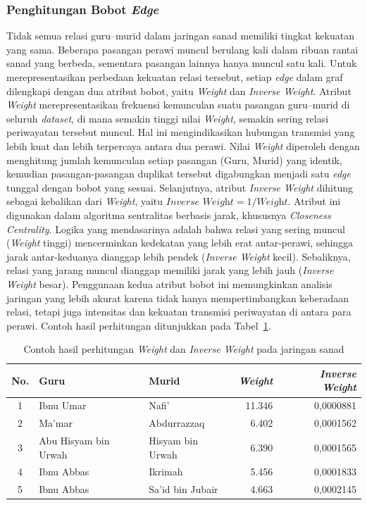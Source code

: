 \subsubsection{Penghitungan Bobot \textit{Edge}}
\label{subsubsec:bobot-edge}
Tidak semua relasi guru--murid dalam jaringan sanad memiliki tingkat kekuatan yang sama. Beberapa pasangan perawi muncul berulang kali dalam ribuan rantai sanad yang berbeda, sementara pasangan lainnya hanya muncul satu kali. 
Untuk merepresentasikan perbedaan kekuatan relasi tersebut, setiap \textit{edge} dalam graf dilengkapi dengan dua atribut bobot, yaitu \textit{Weight} dan \textit{Inverse Weight}.
Atribut \textit{Weight} merepresentasikan frekuensi kemunculan suatu pasangan guru--murid di seluruh \textit{dataset}, di mana semakin tinggi nilai \textit{Weight}, semakin sering relasi periwayatan tersebut muncul.
Hal ini mengindikasikan hubungan transmisi yang lebih kuat dan lebih terpercaya antara dua perawi. Nilai \textit{Weight} diperoleh dengan menghitung jumlah kemunculan setiap pasangan (Guru, Murid) yang identik, kemudian pasangan-pasangan duplikat tersebut digabungkan menjadi satu \textit{edge} tunggal dengan bobot yang sesuai.
Selanjutnya, atribut \textit{Inverse Weight} dihitung sebagai kebalikan dari \textit{Weight}, yaitu $\textit{Inverse Weight} = 1/\textit{Weight}$.
Atribut ini digunakan dalam algoritma sentralitas berbasis jarak, khususnya \textit{Closeness Centrality}.
Logika yang mendasarinya adalah bahwa relasi yang sering muncul (\textit{Weight} tinggi) mencerminkan kedekatan yang lebih erat antar-perawi, sehingga jarak antar-keduanya dianggap lebih pendek (\textit{Inverse Weight} kecil).
Sebaliknya, relasi yang jarang muncul dianggap memiliki jarak yang lebih jauh (\textit{Inverse Weight} besar). Penggunaan kedua atribut bobot ini memungkinkan analisis jaringan yang lebih akurat karena tidak hanya mempertimbangkan keberadaan relasi, tetapi juga intensitas dan kekuatan transmisi periwayatan di antara para perawi. Contoh hasil perhitungan ditunjukkan pada Tabel~\ref{tab:bobot-edge}.

\begin{table}[H]
\centering
\caption{Contoh hasil perhitungan \textit{Weight} dan \textit{Inverse Weight} pada jaringan sanad}
\label{tab:bobot-edge}
\renewcommand{\arraystretch}{1.3}
\begin{tabular}{|c|l|l|r|r|}
\hline
\textbf{No.} & \textbf{Guru} & \textbf{Murid} & \textbf{\textit{Weight}} & \textbf{\textit{Inverse Weight}} \\
\hline
1 & Ibnu Umar          & Nafi'            & 11.346 & 0,0000881 \\
\hline
2 & Ma'mar             & Abdurrazzaq      & 6.402  & 0,0001562 \\
\hline
3 & Abu Hisyam bin Urwah   & Hisyam bin Urwah & 6.390  & 0,0001565 \\
\hline
4 & Ibnu Abbas         & Ikrimah          & 5.456  & 0,0001833 \\
\hline
5 & Ibnu Abbas         & Sa'id bin Jubair & 4.663  & 0,0002145 \\
\hline
\end{tabular}
\end{table}

